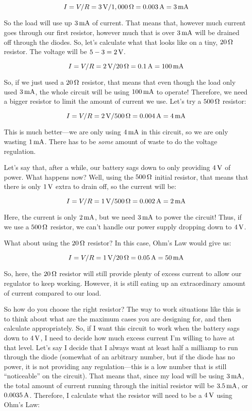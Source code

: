 $$ I = V / R = 3\,\si{\volt} / 1,000\,\si{\ohm} = 0.003\,\si{\ampere} = 3\,\si{\milli\ampere} $$

So the load will use up $3\,\si{\milli\ampere}$ of current.
That means that, however much current goes through our first resistor, however much that is over $3\,\si{\milli\ampere}$ will be drained off through the diodes.
So, let's calculate what that looks like on a tiny, $20\,\si{\ohm}$ resistor.
The voltage will be $5 - 3 = 2\,\si{\volt}$.

$$ I = V / R = 2\,\si{\volt} / 20\,\si{\ohm} = 0.1\,\si{\ampere} = 100\,\si{\milli\ampere} $$

So, if we just used a $20\,\si{\ohm}$ resistor, that means that even though the load only used $3\,\si{\milli\ampere}$, the whole circuit will be using $100\,\si{\milli\ampere}$ to operate!
Therefore, we need a bigger resistor to limit the amount of current we use.
Let's try a $500\,\si{\ohm}$ resistor:

$$ I = V / R = 2\,\si{\volt} / 500\,\si{\ohm} = 0.004\,\si{\ampere} = 4\,\si{\milli\ampere} $$

This is much better---we are only using $4\,\si{\milli\ampere}$ in this circuit, so we are only wasting $1\,\si{\milli\ampere}$.
There has to be \emph{some} amount of waste to do the voltage regulation.

Let's say that, after a while, our battery sags down to only providing $4\,\si{\volt}$ of power.
What happens now?
Well, using the $500\,\si{\ohm}$ initial resistor, that means that there is only $1\,\si{\volt}$ extra to drain off, so the current will be:

$$ I = V / R = 1\,\si{\volt} / 500\,\si{\ohm} = 0.002\,\si{\ampere} = 2\,\si{\milli\ampere} $$

Here, the current is only $2\,\si{\milli\ampere}$, but we need $3\,\si{\milli\ampere}$ to power the circuit!
Thus, if we use a $500\,\si{\ohm}$ resistor, we can't handle our power supply dropping down to $4\,\si{\volt}$.

What about using the $20\,\si{\ohm}$ resistor?
In this case, Ohm's Law would give us:

$$ I = V / R = 1\,\si{\volt} / 20\,\si{\ohm} = 0.05\,\si{\ampere} = 50\,\si{\milli\ampere} $$

So, here, the $20\,\si{\ohm}$ resistor will still provide plenty of excess current to allow our regulator to keep working.
However, it is still eating up an extraordinary amount of current compared to our load.

So how do you choose the right resistor?
The way to work situations like this is to think about what are the maximum cases you are designing for, and then calculate appropriately.
So, if I want this circuit to work when the battery sags down to $4\,\si{\volt}$, I need to decide how much excess current I'm willing to have at that level.
Let's say I decide that I always want at least half a milliamp to run through the diode (somewhat of an arbitrary number, but if the diode has no power, it is not providing any regulation---this is a low number that is still ``noticeable'' on the circuit).
That means that, since my load will be using $3\,\si{\milli\ampere}$, the total amount of current running through the initial resistor will be $3.5\,\si{\milli\ampere}$, or $0.0035\,\si{\ampere}$.
Therefore, I calculate what the resistor will need to be a $4\,\si{\volt}$ using Ohm's Law:

